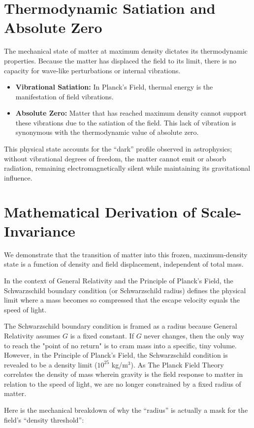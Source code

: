 \documentclass[12pt,a4paper]{article}
\begin{document}
\section{Thermodynamic Satiation and Absolute Zero}
The mechanical state of matter at maximum density dictates its thermodynamic properties. Because the matter has displaced the field to its limit, there is no capacity for wave-like perturbations or internal vibrations.
\begin{itemize}
    \item \textbf{Vibrational Satiation:} In Planck's Field, thermal energy is the manifestation of field vibrations. 
    \item \textbf{Absolute Zero:} Matter that has reached maximum density cannot support these vibrations due to the satiation of the field. This lack of vibration is synonymous with the thermodynamic value of absolute zero.
\end{itemize}
This physical state accounts for the ``dark'' profile observed in astrophysics; without vibrational degrees of freedom, the matter cannot emit or absorb radiation, remaining electromagnetically silent while maintaining its gravitational influence.

\section{Mathematical Derivation of Scale-Invariance}
We demonstrate that the transition of matter into this frozen, maximum-density state is a function of density and field displacement, independent of total mass.

In the context of General Relativity and the Principle of Planck's Field, the Schwarzschild boundary condition (or Schwarzschild radius) defines the physical limit where a mass becomes so compressed that the escape velocity equals the speed of light.

The Schwarzschild boundary condition is framed as a radius because General Relativity assumes $G$ is a fixed constant. If $G$ never changes, then the only way to reach the "point of no return" is to cram mass into a specific, tiny volume. However, in the Principle of Planck's Field, the Schwarzschild condition is revealed to be a density limit ($10^{25}$ kg/m$^3$). As The Planck Field Theory correlates the density of mass wherein gravity is the field response to matter in relation to the speed of light, we are no longer constrained by a fixed radius of matter. 

Here is the mechanical breakdown of why the ``radius'' is actually a mask for the field's ``density threshold'':
\end{document}
